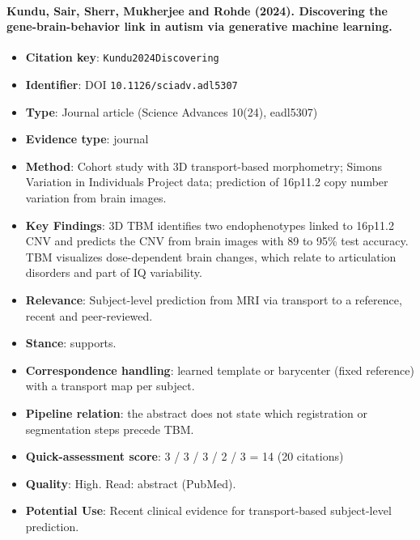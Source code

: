 \documentclass[journal,onecolumn]{IEEEtran}
\begin{document}
\paragraph{Kundu, Sair, Sherr, Mukherjee and Rohde (2024). Discovering the gene-brain-behavior link in autism via generative machine learning.~\cite{Kundu2024Discovering}}\mbox{}

\begin{itemize}

\item{} \textbf{Citation key}: \texttt{Kundu2024Discovering}

\item{} \textbf{Identifier}: DOI \nolinkurl{10.1126/sciadv.adl5307}

\item{} \textbf{Type}: Journal article (Science Advances 10(24), eadl5307)

\item{} \textbf{Evidence type}: journal

\item{} \textbf{Method}: Cohort study with 3D transport-based morphometry; Simons Variation in Individuals Project data; prediction of 16p11.2 copy number variation from brain images.

\item{} \textbf{Key Findings}: 3D TBM identifies two endophenotypes linked to 16p11.2 CNV and predicts the CNV from brain images with 89 to 95\% test accuracy. TBM visualizes dose-dependent brain changes, which relate to articulation disorders and part of IQ variability.

\item{} \textbf{Relevance}: Subject-level prediction from MRI via transport to a reference, recent and peer-reviewed.

\item{} \textbf{Stance}: supports.

\item{} \textbf{Correspondence handling}: learned template or barycenter (fixed reference) with a transport map per subject.

\item{} \textbf{Pipeline relation}: the abstract does not state which registration or segmentation steps precede TBM.

\item{} \textbf{Quick-assessment score}: 3 / 3 / 3 / 2 / 3 = 14 (20 citations)

\item{} \textbf{Quality}: High. Read: abstract (PubMed).

\item{} \textbf{Potential Use}: Recent clinical evidence for transport-based subject-level prediction.

\end{itemize}
\end{document}
